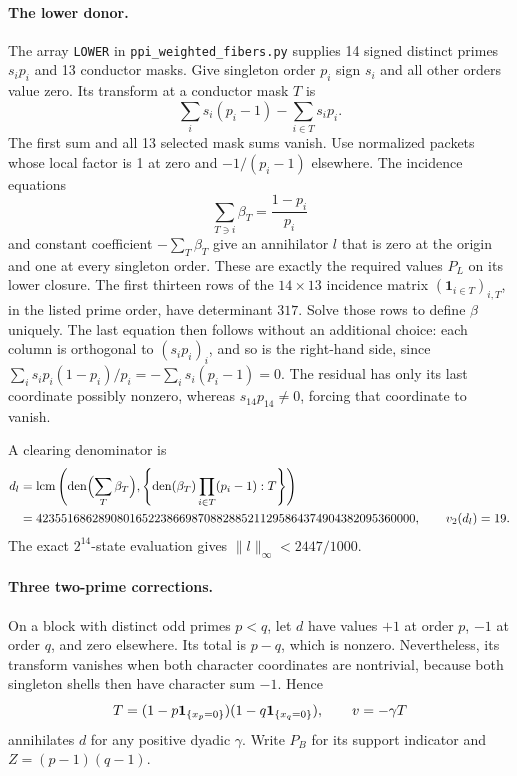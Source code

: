 \paragraph{The lower donor.}
The array \texttt{LOWER} in \texttt{ppi\_weighted\_fibers.py} supplies 14 signed distinct primes $s_i p_i$ and 13
conductor masks.  Give singleton order $p_i$ sign $s_i$ and all other
orders value zero.  Its transform at a conductor mask $T$ is
\[
 \sum_i s_i(p_i-1)-\sum_{i\in T}s_i p_i.
\]
The first sum and all 13 selected mask sums vanish.  Use normalized
packets whose local factor is 1 at zero and $-1/(p_i-1)$ elsewhere.
The incidence equations
\[
 \sum_{T\ni i}\beta_T=\frac{1-p_i}{p_i}
\]
and constant coefficient $-\sum_T\beta_T$ give an annihilator $l$ that
is zero at the origin and one at every singleton order.  These are
exactly the required values $P_L$ on its lower closure.
The first thirteen rows of the $14\times13$ incidence matrix
$(\mathbf1_{i\in T})_{i,T}$, in the listed prime order, have determinant
$317$. Solve those rows to define $\beta$ uniquely. The last equation
then follows without an additional choice: each column is orthogonal
to $(s_ip_i)_i$, and so is the right-hand side, since
$\sum_i s_ip_i(1-p_i)/p_i=-\sum_i s_i(p_i-1)=0$.
The residual has only its last coordinate possibly nonzero, whereas
$s_{14}p_{14}\ne0$, forcing that coordinate to vanish.

A clearing
denominator is
\begin{align*}
 d_l&=\operatorname{lcm}\left(
       \operatorname{den}\Bigl(\sum_T\beta_T\Bigr),
       \left\{\operatorname{den}(\beta_T)
                   \prod_{i\in T}(p_i-1):T\right\}\right)\\
    &=4235516862890801652238669870882885211295864374904382095360000,
 \qquad v_2(d_l)=19.
\end{align*}
The exact $2^{14}$-state evaluation gives
$\|l\|_\infty<2447/1000$.

\paragraph{Three two-prime corrections.}
On a block with distinct odd primes $p<q$, let $d$ have values $+1$ at
order $p$, $-1$ at order $q$, and zero elsewhere.  Its total is $p-q$,
which is nonzero.  Nevertheless, its transform vanishes when both
character coordinates are nontrivial, because both singleton shells
then have character sum $-1$.  Hence
\[
 T=(1-p\mathbf1_{\{x_p=0\}})(1-q\mathbf1_{\{x_q=0\}}),\qquad
 v=-\gamma T
\]
annihilates $d$ for any positive dyadic $\gamma$.  Write $P_B$ for its support
indicator and $Z=(p-1)(q-1)$.

